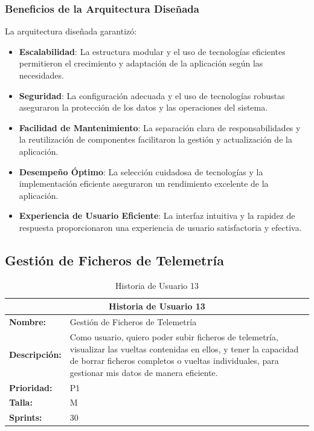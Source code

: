 \subsubsection*{Beneficios de la Arquitectura Diseñada}
La arquitectura diseñada garantizó:
\begin{itemize}
    \item \textbf{Escalabilidad}: La estructura modular y el uso de tecnologías eficientes permitieron el crecimiento y adaptación de la aplicación según las necesidades.
    \item \textbf{Seguridad}: La configuración adecuada y el uso de tecnologías robustas aseguraron la protección de los datos y las operaciones del sistema.
    \item \textbf{Facilidad de Mantenimiento}: La separación clara de responsabilidades y la reutilización de componentes facilitaron la gestión y actualización de la aplicación.
    \item \textbf{Desempeño Óptimo}: La selección cuidadosa de tecnologías y la implementación eficiente aseguraron un rendimiento excelente de la aplicación.
    \item \textbf{Experiencia de Usuario Eficiente}: La interfaz intuitiva y la rapidez de respuesta proporcionaron una experiencia de usuario satisfactoria y efectiva.
\end{itemize}

\subsection{Gestión de Ficheros de Telemetría}
\begin{table}[H]
\centering
\begin{tabular}{|l|p{10cm}|}
\hline
\multicolumn{2}{|c|}{\textbf{Historia de Usuario 13}} \\ \hline
\textbf{Nombre:} & Gestión de Ficheros de Telemetría \\ \hline
\textbf{Descripción:} & Como usuario, quiero poder subir ficheros de telemetría, visualizar las vueltas contenidas en ellos, y tener la capacidad de borrar ficheros completos o vueltas individuales, para gestionar mis datos de manera eficiente. \\ \hline
\textbf{Prioridad:} & P1 \\ \hline
\textbf{Talla:} & M \\ \hline
\textbf{Sprints:} & 30 \\ \hline
\end{tabular}
\caption{Historia de Usuario 13}
\label{tab:gestion_ficheros_telemetria}
\end{table}


